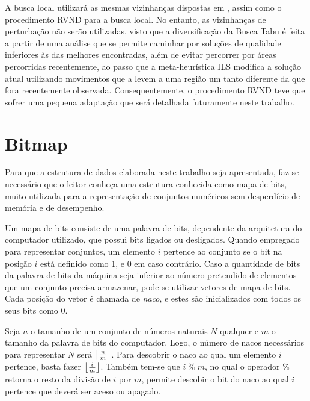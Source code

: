 \par A busca local utilizará as mesmas vizinhanças dispostas em \citet{art:REF_ART_1}, assim como o procedimento RVND para a busca local. No entanto, as vizinhanças de perturbação não serão utilizadas, visto que a diversificação da Busca Tabu é feita a partir de uma análise que se permite caminhar por soluções de qualidade inferiores às das melhores encontradas, além de evitar percorrer por áreas percorridas recentemente, ao passo que a meta-heurística ILS modifica a solução atual utilizando movimentos que a levem a uma região um tanto diferente da que fora recentemente observada. Consequentemente, o procedimento RVND teve que sofrer uma pequena adaptação que será detalhada futuramente neste trabalho.

\section{Bitmap}\label{sec:LABEL_CHP_6_SEC_B}

\par Para que a estrutura de dados elaborada neste trabalho seja apresentada, faz-se necessário que o leitor conheça uma estrutura conhecida como mapa de bits, muito utilizada para a representação de conjuntos numéricos sem desperdício de memória e de desempenho. 

\par Um mapa de bits consiste de uma palavra de bits, dependente da arquitetura do computador utilizado, que possui bits ligados ou desligados. Quando empregado para representar conjuntos, um elemento $i$ pertence ao conjunto se o bit na posição $i$ está definido como 1, e 0 em caso contrário. Caso a quantidade de bits da palavra de bits da máquina seja inferior ao número pretendido de elementos que um conjunto precisa armazenar, pode-se utilizar vetores de mapa de bits. Cada posição do vetor é chamada de \textit{naco}, e estes são inicializados com todos os seus bits como $0$.

\par Seja $n$ o tamanho de um conjunto de números naturais $N$ qualquer e $m$ o tamanho da palavra de bits do computador. Logo, o número de nacos necessários para representar $N$ será $\ceil*{\frac{n}{m}}$. Para descobrir o naco ao qual um elemento $i$ pertence, basta fazer $\floor*{\frac{i}{m}}$. Também tem-se que $i \;\%\; m$, no qual o operador $\%$ retorna o resto da divisão de $i$ por $m$, permite descobir o bit do naco ao qual $i$ pertence que deverá ser aceso ou apagado.

